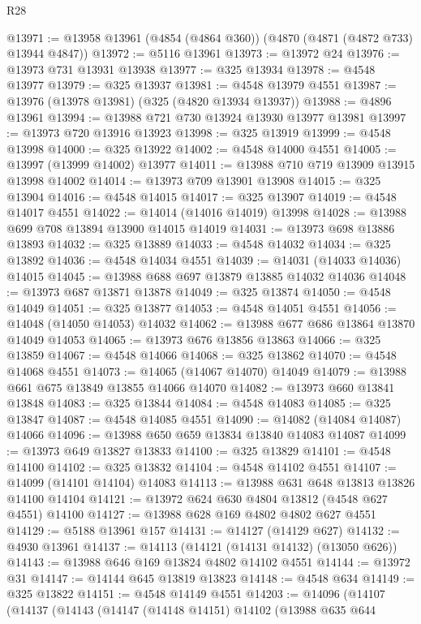 \begin{lexlean}{R28}
\begin{coremodule}
@13971 := @13958 @13961 (@4854 (@4864 @360)) (@4870 (@4871 (@4872 @733) @13944 @4847))
@13972 := @5116 @13961
@13973 := @13972 @24
@13976 := @13973 @731 @13931 @13938
@13977 := @325 @13934
@13978 := @4548 @13977
@13979 := @325 @13937
@13981 := @4548 @13979 @4551
@13987 := @13976 (@13978 @13981) (@325 (@4820 @13934 @13937))
@13988 := @4896 @13961
@13994 := @13988 @721 @730 @13924 @13930 @13977 @13981
@13997 := @13973 @720 @13916 @13923
@13998 := @325 @13919
@13999 := @4548 @13998
@14000 := @325 @13922
@14002 := @4548 @14000 @4551
@14005 := @13997 (@13999 @14002) @13977
@14011 := @13988 @710 @719 @13909 @13915 @13998 @14002
@14014 := @13973 @709 @13901 @13908
@14015 := @325 @13904
@14016 := @4548 @14015
@14017 := @325 @13907
@14019 := @4548 @14017 @4551
@14022 := @14014 (@14016 @14019) @13998
@14028 := @13988 @699 @708 @13894 @13900 @14015 @14019
@14031 := @13973 @698 @13886 @13893
@14032 := @325 @13889
@14033 := @4548 @14032
@14034 := @325 @13892
@14036 := @4548 @14034 @4551
@14039 := @14031 (@14033 @14036) @14015
@14045 := @13988 @688 @697 @13879 @13885 @14032 @14036
@14048 := @13973 @687 @13871 @13878
@14049 := @325 @13874
@14050 := @4548 @14049
@14051 := @325 @13877
@14053 := @4548 @14051 @4551
@14056 := @14048 (@14050 @14053) @14032
@14062 := @13988 @677 @686 @13864 @13870 @14049 @14053
@14065 := @13973 @676 @13856 @13863
@14066 := @325 @13859
@14067 := @4548 @14066
@14068 := @325 @13862
@14070 := @4548 @14068 @4551
@14073 := @14065 (@14067 @14070) @14049
@14079 := @13988 @661 @675 @13849 @13855 @14066 @14070
@14082 := @13973 @660 @13841 @13848
@14083 := @325 @13844
@14084 := @4548 @14083
@14085 := @325 @13847
@14087 := @4548 @14085 @4551
@14090 := @14082 (@14084 @14087) @14066
@14096 := @13988 @650 @659 @13834 @13840 @14083 @14087
@14099 := @13973 @649 @13827 @13833
@14100 := @325 @13829
@14101 := @4548 @14100
@14102 := @325 @13832
@14104 := @4548 @14102 @4551
@14107 := @14099 (@14101 @14104) @14083
@14113 := @13988 @631 @648 @13813 @13826 @14100 @14104
@14121 := @13972 @624 @630 @4804 @13812 (@4548 @627 @4551) @14100
@14127 := @13988 @628 @169 @4802 @4802 @627 @4551
@14129 := @5188 @13961 @157
@14131 := @14127 (@14129 @627)
@14132 := @4930 @13961
@14137 := @14113 (@14121 (@14131 @14132) (@13050 @626))
@14143 := @13988 @646 @169 @13824 @4802 @14102 @4551
@14144 := @13972 @31
@14147 := @14144 @645 @13819 @13823
@14148 := @4548 @634
@14149 := @325 @13822
@14151 := @4548 @14149 @4551
@14203 := @14096
    (@14107
      (@14137
        (@14143
          (@14147
            (@14148 @14151)
            @14102
            (@13988
              @635
              @644

\end{coremodule}
\end{lexlean}
